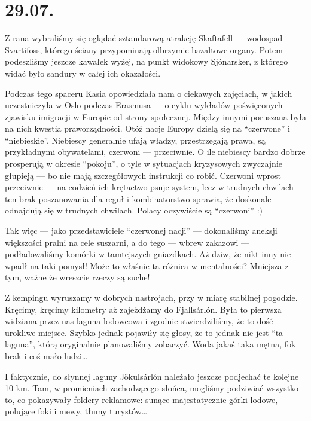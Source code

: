 \chapter*{29.07.}

Z rana wybraliśmy się oglądać sztandarową atrakcję Skaftafell --- wodospad Svartifoss, którego ściany przypominają olbrzymie bazaltowe organy. Potem podeszliśmy jeszcze kawałek wyżej, na punkt widokowy Sjónarsker, z którego widać było sandury w całej ich okazałości.

Podczas tego spaceru Kasia opowiedziała nam o ciekawych zajęciach, w jakich uczestniczyła w Oslo podczas Erasmusa --- o cyklu wykładów poświęconych zjawisku imigracji w Europie od strony społecznej. Między innymi poruszana była na nich kwestia praworządności. Otóż nacje Europy dzielą się na “czerwone” i “niebieskie”. Niebiescy generalnie ufają władzy, przestrzegają prawa, są przykładnymi obywatelami, czerwoni --- przeciwnie. O ile niebiescy bardzo dobrze prosperują w okresie “pokoju”, o tyle w sytuacjach kryzysowych zwyczajnie głupieją --- bo nie mają szczegółowych instrukcji co robić. Czerwoni wprost przeciwnie --- na codzień ich krętactwo psuje system, lecz w trudnych chwilach ten brak poszanowania dla reguł i kombinatorstwo sprawia, że doskonale odnajdują się w trudnych chwilach. Polacy oczywiście są “czerwoni” :)

Tak więc --- jako przedstawiciele “czerwonej nacji” --- dokonaliśmy aneksji większości pralni na cele suszarni, a do tego --- wbrew zakazowi --- podładowaliśmy komórki w tamtejszych gniazdkach. Aż dziw, że nikt inny nie wpadł na taki pomysł! Może to właśnie ta różnica w mentalności? Mniejsza z tym, ważne że wreszcie rzeczy są suche!


Z kempingu wyruszamy w dobrych nastrojach, przy w miarę stabilnej pogodzie. Kręcimy, kręcimy kilometry aż zajeżdżamy do Fjallsárlón. Była to pierwsza widziana przez nas laguna lodowcowa i zgodnie stwierdziliśmy, że to dość urokliwe miejsce. Szybko jednak pojawiły się głosy, że to jednak nie jest “ta laguna”, którą oryginalnie planowaliśmy zobaczyć. Woda jakaś taka mętna, fok brak i coś mało ludzi…


I faktycznie, do słynnej laguny Jökulsárlón należało jeszcze podjechać te kolejne 10 km. Tam, w promieniach zachodzącego słońca, mogliśmy podziwiać wszystko to, co pokazywały foldery reklamowe: sunące majestatycznie górki lodowe, polujące foki i mewy, tłumy turystów…

